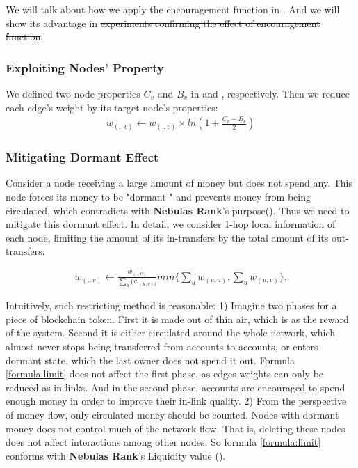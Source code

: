 We will talk about how we apply the encouragement function in . And we will show its advantage in  \st{experiments confirming the effect of encouragement function}.

\subsubsection{Exploiting Nodes' Property} \label{subsec:reduction}
We defined two node properties $C_v$ and $B_v$ in  and , respectively. Then we reduce each edge's weight by its target node's properties:
\begin{align}
	w_{(.,v)} \leftarrow w_{(.,v)} \times ln(1 + \frac{C_v + B_v}{2})
\end{align}

\subsubsection{Mitigating Dormant Effect} \label{subsec:limit}
Consider a node receiving a large amount of money but does not spend any. This node forces its money to be "dormant " and prevents money from being circulated, which contradicts with \textbf{Nebulas Rank}'s purpose(). Thus we need to mitigate this dormant effect. In detail, we consider 1-hop local information of each node, limiting the amount of its in-transfers by the total amount of its out-transfers:

\begin{align}
\label{formula:limit}
w_{(.,v)} \leftarrow  \frac{w_{(.,v)}}{\sum_u(w_{(u,v))}} min\{ \sum_u{w_{(v,u)}}, \sum_u{w_{(u,v)}} \}.
\end{align} 

Intuitively, such restricting method is reasonable: 1) Imagine two phases for a piece of blockchain token. First it is made out of thin air, which is as the reward of the system. Second it is either circulated around the whole network, which almost never stops being transferred from accounts to accounts, or enters dormant state, which the last owner does not spend it out. Formula \ref{formula:limit} does not affect the first phase, as edges weights can only be reduced as in-links. And in the second phase, accounts are encouraged to spend enough money in order to improve their in-link quality. 2) From the perspective of money flow, only circulated money should be counted. Nodes with dormant money does not control much of the network flow. That is, deleting these nodes does not affect interactions among other nodes. So formula \ref{formula:limit} conforms with \textbf{Nebulas Rank}'s Liquidity value ().

